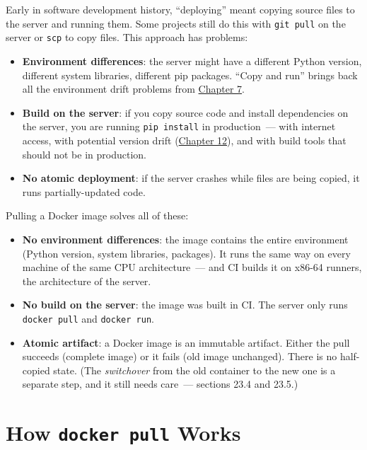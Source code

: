 Early in software development history, ``deploying'' meant copying source files to the server and running them. Some projects still do this with \texttt{git\ pull} on the server or \texttt{scp} to copy files. This approach has problems:

\begin{itemize}
\tightlist
\item
  \textbf{Environment differences}: the server might have a different Python version, different system libraries, different pip packages. ``Copy and run'' brings back all the environment drift problems from \hyperref[ch:07-environment-drift]{Chapter 7}.
\item
  \textbf{Build on the server}: if you copy source code and install dependencies on the server, you are running \texttt{pip\ install} in production~--- with internet access, with potential version drift (\hyperref[ch:12-dependency-declaration]{Chapter 12}), and with build tools that should not be in production.
\item
  \textbf{No atomic deployment}: if the server crashes while files are being copied, it runs partially-updated code.
\end{itemize}

\noindent{}Pulling a Docker image solves all of these:

\begin{itemize}
\tightlist
\item
  \textbf{No environment differences}: the image contains the entire environment (Python version, system libraries, packages). It runs the same way on every machine of the same CPU architecture~--- and CI builds it on x86-64 runners, the architecture of the server.
\item
  \textbf{No build on the server}: the image was built in CI. The server only runs \texttt{docker\ pull} and \texttt{docker\ run}.
\item
  \textbf{Atomic artifact}: a Docker image is an immutable artifact. Either the pull succeeds (complete image) or it fails (old image unchanged). There is no half-copied state. (The \emph{switchover} from the old container to the new one is a separate step, and it still needs care~--- sections 23.4 and 23.5.)
\end{itemize}

\setcounter{section}{1}
\section{\texorpdfstring{How \texttt{docker\ pull} Works}{How docker pull Works}}\label{23-code-transfer:232-how-docker-pull-works}

